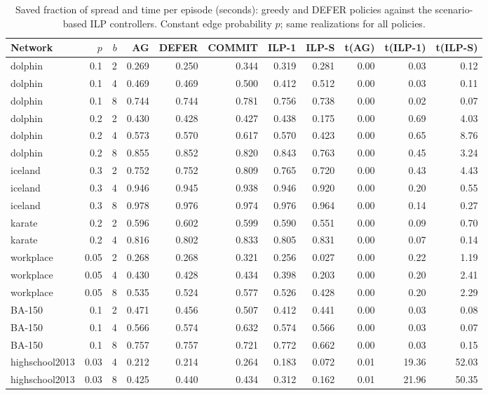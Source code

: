 \documentclass[preprint,11pt]{elsarticle}
\theoremstyle{definition}
\theoremstyle{remark}
\begin{document}
\begin{table}[h]
\centering
\caption{Saved fraction of spread and time per episode (seconds): greedy and DEFER
policies against the scenario-based ILP controllers. Constant edge probability
$p$; same realizations for all policies.\label{tab:ilp}}
\footnotesize
\begin{tabular}{lrrrrrrrrrr}
\hline
Network & $p$ & $b$ & AG & DEFER & COMMIT & ILP-1 & ILP-S & t(AG) & t(ILP-1) & t(ILP-S)\\
\hline
dolphin & 0.1 & 2 & 0.269 & 0.250 & 0.344 & 0.319 & 0.281 & 0.00 & 0.03 & 0.12 \\
dolphin & 0.1 & 4 & 0.469 & 0.469 & 0.500 & 0.412 & 0.512 & 0.00 & 0.03 & 0.11 \\
dolphin & 0.1 & 8 & 0.744 & 0.744 & 0.781 & 0.756 & 0.738 & 0.00 & 0.02 & 0.07 \\
dolphin & 0.2 & 2 & 0.430 & 0.428 & 0.427 & 0.438 & 0.175 & 0.00 & 0.69 & 4.03 \\
dolphin & 0.2 & 4 & 0.573 & 0.570 & 0.617 & 0.570 & 0.423 & 0.00 & 0.65 & 8.76 \\
dolphin & 0.2 & 8 & 0.855 & 0.852 & 0.820 & 0.843 & 0.763 & 0.00 & 0.45 & 3.24 \\
iceland & 0.3 & 2 & 0.752 & 0.752 & 0.809 & 0.765 & 0.720 & 0.00 & 0.43 & 4.43 \\
iceland & 0.3 & 4 & 0.946 & 0.945 & 0.938 & 0.946 & 0.920 & 0.00 & 0.20 & 0.55 \\
iceland & 0.3 & 8 & 0.978 & 0.976 & 0.974 & 0.976 & 0.964 & 0.00 & 0.14 & 0.27 \\
karate & 0.2 & 2 & 0.596 & 0.602 & 0.599 & 0.590 & 0.551 & 0.00 & 0.09 & 0.70 \\
karate & 0.2 & 4 & 0.816 & 0.802 & 0.833 & 0.805 & 0.831 & 0.00 & 0.07 & 0.14 \\
workplace & 0.05 & 2 & 0.268 & 0.268 & 0.321 & 0.256 & 0.027 & 0.00 & 0.22 & 1.19 \\
workplace & 0.05 & 4 & 0.430 & 0.428 & 0.434 & 0.398 & 0.203 & 0.00 & 0.20 & 2.41 \\
workplace & 0.05 & 8 & 0.535 & 0.524 & 0.577 & 0.526 & 0.428 & 0.00 & 0.20 & 2.29 \\
BA-150 & 0.1 & 2 & 0.471 & 0.456 & 0.507 & 0.412 & 0.441 & 0.00 & 0.03 & 0.08 \\
BA-150 & 0.1 & 4 & 0.566 & 0.574 & 0.632 & 0.574 & 0.566 & 0.00 & 0.03 & 0.07 \\
BA-150 & 0.1 & 8 & 0.757 & 0.757 & 0.721 & 0.772 & 0.662 & 0.00 & 0.03 & 0.15 \\
highschool2013 & 0.03 & 4 & 0.212 & 0.214 & 0.264 & 0.183 & 0.072 & 0.01 & 19.36 & 52.03 \\
highschool2013 & 0.03 & 8 & 0.425 & 0.440 & 0.434 & 0.312 & 0.162 & 0.01 & 21.96 & 50.35 \\
\hline
\end{tabular}
\end{table}
\end{document}
